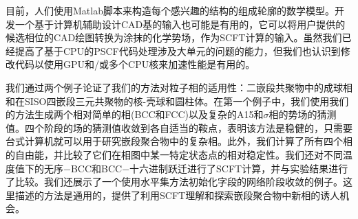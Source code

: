 \documentclass[12pt,a4paper]{article}
\begin{document}
目前，人们使用Matlab脚本来构造每个感兴趣的结构的组成轮廓的数学模型。开发一个基于计算机辅助设计CAD基的输入也可能是有用的，它可以将用户提供的候选相位的CAD绘图转换为涂抹的化学势场，作为SCFT计算的输入。虽然我们已经提高了基于CPU的PSCF代码处理涉及大单元的问题的能力，但我们也认识到修改代码以使用GPU和/或多个CPU核来加速性能是有用的。

我们通过两个例子论证了我们的方法对粒子相的适用性：二嵌段共聚物中的成球相和在SISO四嵌段三元共聚物的核-壳球和圆柱体。在第一个例子中，我们使用我们的方法生成两个相对简单的相(BCC和FCC)以及复杂的A15和$\sigma$相的势场的猜测值。四个阶段的场的猜测值收敛到各自适当的鞍点，表明该方法是稳健的，只需要台式计算机就可以用于研究嵌段聚合物中的复杂相。此外，我们计算了所有四个相的自由能，并比较了它们在相图中某一特定状态点的相对稳定性。我们还对不同温度值下的无序−BCC和BCC−十六进制跃迁进行了SCFT计算，并与实验结果进行了比较。我们还展示了一个使用水平集方法初始化字段的网络阶段收敛的例子。这里描述的方法是通用的，提供了利用SCFT理解和探索嵌段聚合物中新相的诱人机会。



\cite{tam19912d}
%
\end{document}
